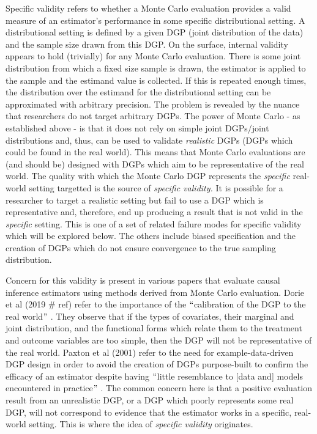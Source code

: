 \documentclass[../main.tex]{subfiles}
\begin{document}
Specific validity refers to whether a Monte Carlo evaluation provides a valid measure of an estimator’s performance in some specific distributional setting. A distributional setting is defined by a given DGP (joint distribution of the data) and the sample size drawn from this DGP. On the surface, internal validity appears to hold (trivially) for any Monte Carlo evaluation. There is some joint distribution from which a fixed size sample is drawn, the estimator is applied to the sample and the estimand value is collected. If this is repeated enough times, the distribution over the estimand for the distributional setting can be approximated with arbitrary precision. The problem is revealed by the nuance that researchers do not target arbitrary DGPs. The power of Monte Carlo - as established above - is that it does not rely on simple joint DGPs/joint distributions and, thus, can be used to validate \textit{realistic} DGPs (DGPs which could be found in the real world). This means that Monte Carlo evaluations are (and should be) designed with DGPs which aim to be representative of the real world. The quality with which the Monte Carlo DGP represents the \textit{specific }real-world setting targetted is the source of \textit{specific validity. }It is possible for a researcher to target a realistic setting but fail to use a DGP which is representative and, therefore, end up producing a result that is not valid in the \textit{specific }setting. This is one of a set of related failure modes for specific validity which will be explored below. The others include biased specification and the creation of DGPs which do not ensure convergence to the true sampling distribution.\par


\vspace{\baselineskip}
Concern for this validity is present in various papers that evaluate causal inference estimators using methods derived from Monte Carlo evaluation. Dorie et al (2019 $\#$ ref) refer to the importance of the $``$calibration of the DGP to the real world$"$ . They observe that if the types of covariates, their marginal and joint distribution, and the functional forms which relate them to the treatment and outcome variables are too simple, then the DGP will not be representative of the real world. Paxton et al (2001) refer to the need for example-data-driven DGP design in order to avoid the creation of DGPs purpose-built to confirm the efficacy of an estimator despite having $``$little resemblance to [data and] models encountered in practice$"$ . The common concern here is that a positive evaluation result from an unrealistic DGP, or a DGP which poorly represents some real DGP, will not correspond to evidence that the estimator works in a specific, real-world setting. This is where the idea of \textit{specific validity }originates.\par
\end{document}
